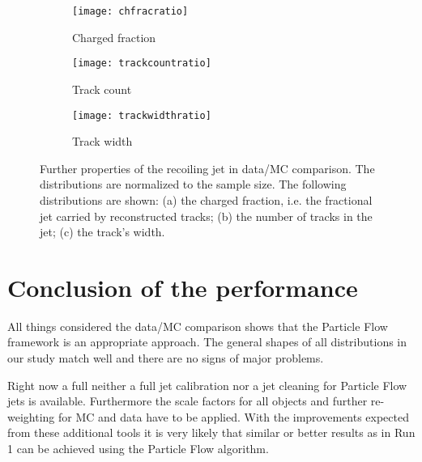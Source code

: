 \begin{figure}[h]
\centering
\begin{subfigure}[b]{0.5\figwidth}
\texttt{[image: chfracratio]}
\caption[Charged fraction]{Charged fraction}
\label{fig:chfrac}
\end{subfigure}


\centering
\begin{subfigure}[b]{0.5\figwidth}
\texttt{[image: trackcountratio]}
\caption[Track count]{Track count}
\label{fig:trackcount}
\end{subfigure}
\quad
\begin{subfigure}[b]{0.5\figwidth}
\texttt{[image: trackwidthratio]}
\caption[trackwidth]{Track width}
\label{fig:trackwidth}
\end{subfigure}
\caption{Further properties of the recoiling jet in data/MC comparison. The distributions are normalized to the sample size. The following distributions are shown: (a) the charged fraction, i.e. the fractional jet \pT carried by reconstructed tracks; (b) the number of tracks in the jet; (c) the track's width.}
\label{fig:generalproperties}
\end{figure}


\section{Conclusion of the performance}

All things considered the data/MC comparison shows that the Particle Flow framework is an appropriate approach. The general shapes of all distributions in our study match well and there are no signs of major problems.

Right now a full neither a full jet calibration nor a jet cleaning for Particle Flow jets is available. Furthermore the scale factors for all objects and further re-weighting for MC and data have to be applied.
With the improvements expected from these additional tools it is very likely that similar or better results as in Run 1 can be achieved using the Particle Flow algorithm.


\label{results}
